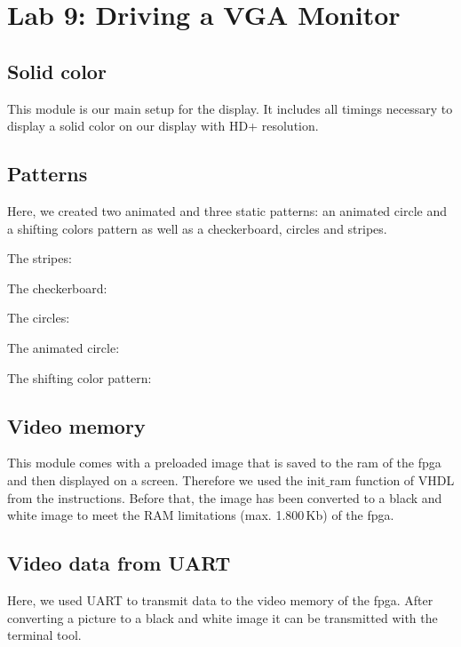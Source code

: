 \chapter{Lab 9: Driving a VGA Monitor}

\section{Solid color}

This module is our main setup for the display. It includes all timings necessary to display a solid color on our display with HD+ resolution.



\section{Patterns}

Here, we created two animated and three static patterns: an animated circle and a shifting colors pattern as well as a checkerboard, circles and stripes.

The stripes:



The checkerboard:


The circles:



The animated circle:



The shifting color pattern:



\section{Video memory}

This module comes with a preloaded image that is saved to the ram of the \gls{fpga} and then displayed on a screen. Therefore we used the init$\_$ram function of VHDL from the instructions. Before that, the image has been converted to a black and white image to meet the RAM limitations (max. 1.800\,Kb) of the \gls{fpga}.





\section{Video data from UART}

Here, we used UART to transmit data to the video memory of the \gls{fpga}. After converting a picture to a black and white image it can be transmitted with the terminal tool.


